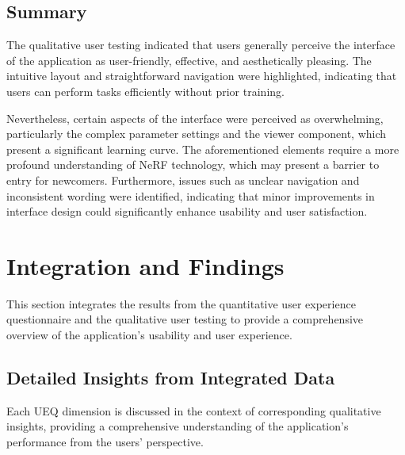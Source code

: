 
\subsection*{Summary}
\label{sec:result:qualitative_summary}

The qualitative user testing indicated that users generally perceive the interface of the application as user-friendly, effective, and aesthetically pleasing.
The intuitive layout and straightforward navigation were highlighted, indicating that users can perform tasks efficiently without prior training.

Nevertheless, certain aspects of the interface were perceived as overwhelming, particularly the complex parameter settings and the viewer component, which present a significant learning curve.
The aforementioned elements require a more profound understanding of NeRF technology, which may present a barrier to entry for newcomers.
Furthermore, issues such as unclear navigation and inconsistent wording were identified, indicating that minor improvements in interface design could significantly enhance usability and user satisfaction.

\section{Integration and Findings}
\label{sec:result:findings}

This section integrates the results from the quantitative user experience questionnaire and the qualitative user testing to provide a comprehensive overview of the application's usability and user experience.

\subsection*{Detailed Insights from Integrated Data}
\label{subsec:findings:detailed_insights}
Each UEQ dimension is discussed in the context of corresponding qualitative insights, providing a comprehensive understanding of the application’s performance from the users' perspective.

